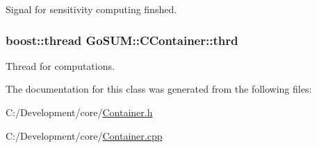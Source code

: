 Signal for sensitivity computing finshed. 

\hypertarget{class_go_s_u_m_1_1_c_container_ac682522f6ba4e2a19e78a7f603b8c52c}{
\subsubsection[{thrd}]{\setlength{\rightskip}{0pt plus 5cm}boost\-::thread Go\-S\-U\-M\-::\-C\-Container\-::thrd}}\label{class_go_s_u_m_1_1_c_container_ac682522f6ba4e2a19e78a7f603b8c52c}


Thread for computations. 



The documentation for this class was generated from the following files\-:\begin{DoxyCompactItemize}
\item 
C\-:/\-Development/core/\hyperlink{_container_8h}{Container.\-h}\item 
C\-:/\-Development/core/\hyperlink{_container_8cpp}{Container.\-cpp}\end{DoxyCompactItemize}
